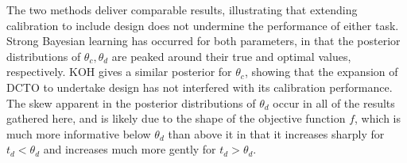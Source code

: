 \documentclass[12pt]{article}
\begin{document}
%
The two methods deliver comparable results, illustrating that extending calibration to include design does not undermine the performance of either task.
%
Strong Bayesian learning has occurred for both parameters, in that the posterior distributions of $\theta_c,\theta_d$ are peaked around their true and optimal values, respectively.
%
KOH gives a similar posterior for $\theta_c$, showing that the expansion of DCTO to undertake design has not interfered with its calibration performance.
%
The skew apparent in the posterior distributions of $\theta_d$ occur in all of the results gathered here, and is likely due to the shape of the objective function $f$, which is much more informative below $\theta_d$ than above it in that it increases sharply for $t_d<\theta_d$ and increases much more gently for $t_d>\theta_d$.
%
\end{document}
